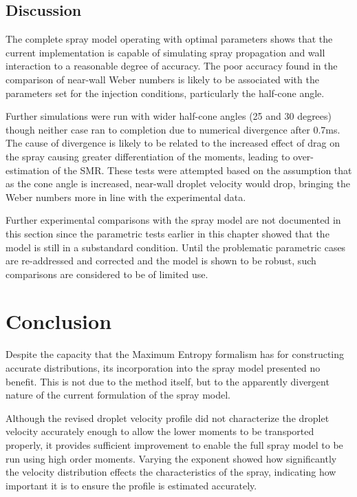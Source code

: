 \documentclass[a4paper,10pt]{article}
\begin{document}
\subsection{Discussion}
The complete spray model operating with optimal parameters shows that the current implementation is capable of simulating spray propagation and wall interaction to a reasonable degree of accuracy. The poor accuracy found in the comparison of near-wall Weber numbers is likely to be associated with the parameters set for the injection conditions, particularly the half-cone angle.

Further simulations were run with wider half-cone angles (25 and 30 degrees) though neither case ran to completion due to numerical divergence after 0.7ms. The cause of divergence is likely to be related to the increased effect of drag on the spray causing greater differentiation of the moments, leading to over-estimation of the SMR. These tests were attempted based on the assumption that as the cone angle is increased, near-wall droplet velocity would drop, bringing the Weber numbers more in line with the experimental data.

Further experimental comparisons with the spray model are not documented in this section since the parametric tests earlier in this chapter showed that the model is still in a substandard condition. Until the problematic parametric cases are re-addressed and corrected and the model is shown to be robust, such comparisons are considered to be of limited use.


\section{Conclusion}
Despite the capacity that the Maximum Entropy formalism has for constructing accurate distributions, its incorporation into the spray model presented no benefit. This is not due to the method itself, but to the apparently divergent nature of the current formulation of the spray model.%

Although the revised droplet velocity profile did not characterize the droplet velocity accurately enough to allow the lower moments to be transported properly, it provides sufficient improvement to enable the full spray model to be run using high order moments. Varying the exponent showed how significantly the velocity distribution effects the characteristics of the spray, indicating how important it is to ensure the profile is estimated accurately.
\end{document}
